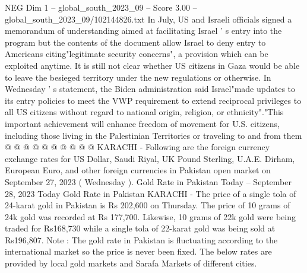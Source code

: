 \begin{textsample}{NEG Dim 1 – global\_south\_2023\_09 – Score 3.00 – global\_south\_2023\_09/102144826.txt}
In July, US and Israeli officials signed a memorandum of understanding aimed at facilitating Israel ' s entry into the program but the contents of the document allow Israel to deny entry to Americans citing"legitimate security concerns", a provision which can be exploited anytime.
It is still not clear whether US citizens in Gaza would be able to leave the besieged territory under the new regulations or otherwise.
In Wednesday ' s statement, the Biden administration said Israel"made updates to its entry policies to meet the VWP requirement to extend reciprocal privileges to all US citizens without regard to national origin, religion, or ethnicity"."This important achievement will enhance freedom of movement for U.S. citizens, including those living in the Palestinian Territories or traveling to and from them @ @ @ @ @ @ @ @ @ @ KARACHI - Following are the foreign currency exchange rates for US Dollar, Saudi Riyal, UK Pound Sterling, U.A.E.
Dirham, European Euro, and other foreign currencies in Pakistan open market on September 27, 2023 ( Wednesday ).
Gold Rate in Pakistan Today -- September 28, 2023 Today Gold Rate in Pakistan KARACHI - The price of a single tola of 24-karat gold in Pakistan is Rs 202,600 on Thursday.
The price of 10 grams of 24k gold was recorded at Rs 177,700.
Likewise, 10 grams of 22k gold were being traded for Rs168,730 while a single tola of 22-karat gold was being sold at Rs196,807.
Note : The gold rate in Pakistan is fluctuating according to the international market so the price is never been fixed.
The below rates are provided by local gold markets and Sarafa Markets of different cities.

\end{textsample}
